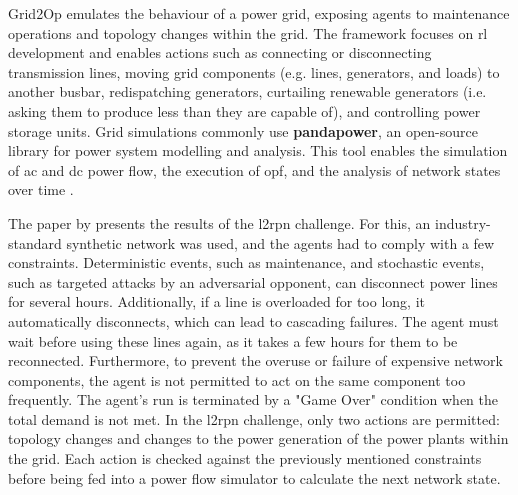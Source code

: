 Grid2Op emulates the behaviour of a power grid, exposing agents to maintenance operations and topology changes within the grid. The framework focuses on \ac{rl} development and enables actions such as connecting or disconnecting transmission lines, moving grid components (e.g. lines, generators, and loads) to another busbar, redispatching generators, curtailing renewable generators (i.e. asking them to produce less than they are capable of), and controlling power storage units. Grid simulations commonly use \textbf{pandapower}, an open-source library for power system modelling and analysis. This tool enables the simulation of \ac{ac} and \ac{dc} power flow, the execution of \ac{opf}, and the analysis of network states over time \cite{pandapower}.

The paper by \citet{l2rpn} presents the results of the \ac{l2rpn} challenge. For this, an industry-standard synthetic network was used, and the agents had to comply with a few constraints. Deterministic events, such as maintenance, and stochastic events, such as targeted attacks by an adversarial opponent, can disconnect power lines for several hours. Additionally, if a line is overloaded for too long, it automatically disconnects, which can lead to cascading failures. The agent must wait before using these lines again, as it takes a few hours for them to be reconnected. Furthermore, to prevent the overuse or failure of expensive network components, the agent is not permitted to act on the same component too frequently. The agent's run is terminated by a "Game Over" condition when the total demand is not met. In the \ac{l2rpn} challenge, only two actions are permitted: topology changes and changes to the power generation of the power plants within the grid. Each action is checked against the previously mentioned constraints before being fed into a power flow simulator to calculate the next network state.

